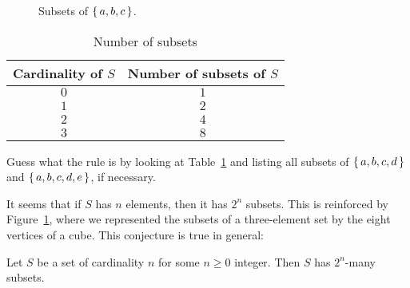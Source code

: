 \begin{figure}[!htb]
\begin{center}
\end{center}
\caption{Subsets of $\left\{\,a, b, c\,\right\}$.}\label{fig:subsetsabc}
\end{figure}

\begin{table}[!htb]
\caption{Number of subsets}\label{tab:noofsubsets}
\begin{center}
\begin{tabular}{|c|c|}
\hline
Cardinality of $S$ & Number of subsets of $S$ \\
\hline \hline
$0$ & $1$ \\
\hline
$1$ & $2$ \\
\hline
$2$ & $4$ \\
\hline
$3$ & $8$ \\
\hline
\end{tabular}
\end{center}
\end{table}

\begin{exercise}\label{ex:abcde}
Guess what the rule is by looking at Table~\ref{tab:noofsubsets} and listing all subsets of $\left\{\,a, b, c, d\,\right\}$ and $\left\{\,a, b, c, d, e\,\right\}$, if necessary. 
\end{exercise}

It seems that if $S$ has $n$ elements, 
then it has $2^n$ subsets. 
This is reinforced by Figure~\ref{fig:subsetsabc}, 
where we represented the subsets of a three-element set by the eight vertices of a cube. 
This conjecture is true in general: 

\begin{theorem}\label{thm:noofsubsets}
Let $S$ be a set of cardinality $n$ for some $n\geq 0$ integer. 
Then $S$ has $2^n$-many subsets. 
\end{theorem}

